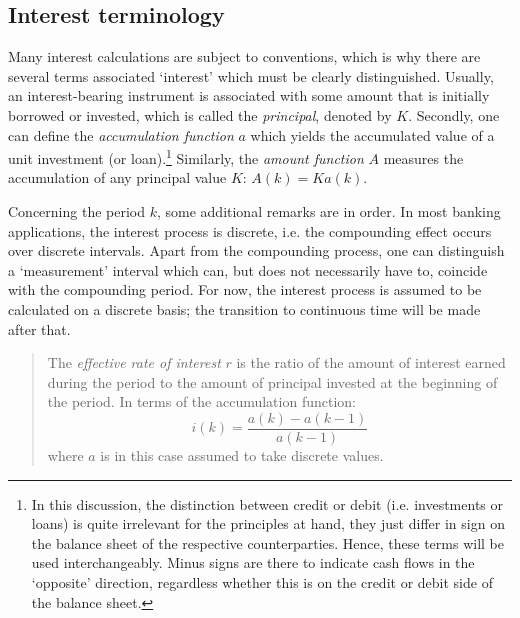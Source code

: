 \subsection{Interest terminology}
Many interest calculations are subject to conventions, which is why there are several terms associated `interest' which must be clearly distinguished. Usually, an interest-bearing instrument is associated with some amount that is initially borrowed or invested, which is called the \emph{principal}, denoted by \(K\). Secondly, one can define  the \emph{accumulation function} \(a\) which yields the accumulated value of a unit investment (or loan).\footnote{In this discussion, the distinction between credit or debit (i.e. investments or loans) is quite irrelevant for the principles at hand, they just differ in sign on the balance sheet of the respective counterparties. Hence, these terms will be used interchangeably. Minus signs are there to indicate cash flows in the `opposite' direction, regardless whether this is on the credit or debit side of the balance sheet.}
Similarly, the \emph{amount function} \(A\) measures the accumulation of any principal value \(K\): \(A(k) = Ka(k)\). \cite{Kellison1991}

Concerning the period \(k\), some additional remarks are in order. In most banking applications, the interest process is discrete, i.e. the compounding effect occurs over discrete intervals. Apart from the compounding process, one can distinguish a `measurement' interval which can, but does not necessarily have to, coincide with the compounding period. For now, the interest process is assumed to be calculated on a discrete basis; the transition to continuous time will be made after that.

\begin{quote}
    The \emph{effective rate of interest} \(r\) is the ratio of the amount of interest earned during the period to the amount of principal invested at the beginning of the period. In terms of the accumulation function:
     \begin{equation}
         i(k) = \frac{a(k) - a(k-1)}{a(k-1)}
         \label{eq:effective_interest}
     \end{equation}
     where \(a\) is in this case assumed to take discrete values.
\end{quote}

\begin{quote}
    
\end{quote}


